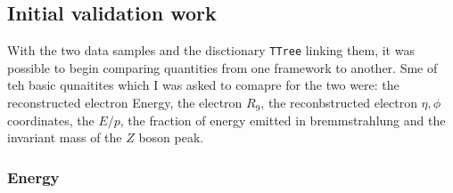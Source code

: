 \documentclass[10pt]{article}
\begin{document}
\subsection{Initial validation work}

With the two data samples and the disctionary \texttt{TTree} linking them, it was possible to begin comparing quantities from one framework to another. Sme of teh basic qunaitites which I was asked to comapre for the two were: the reconstructed electron Energy, the electron $R_9$, the reconbstructed electron $\eta,\phi$ coordinates, the  $E/p$, the fraction of energy emitted in bremmstrahlung and the invariant mass of the $Z$ boson peak.

\subsubsection{Energy}
\end{document}
